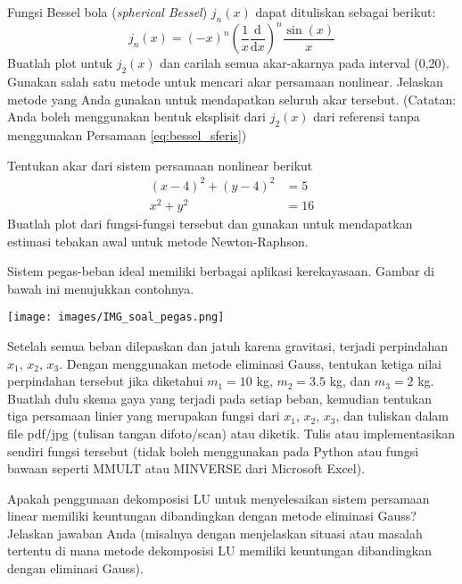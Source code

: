 \begin{soal}
Fungsi Bessel bola (\textit{spherical Bessel}) $j_{n}(x)$ dapat dituliskan sebagai
berikut:
\begin{equation}
j_{n}(x) = (-x)^{n}
\left( \frac{1}{x} \frac{\mathrm{d}}{\mathrm{d}x} \right)^n
\frac{\sin(x)}{x}
\label{eq:bessel_sferis}
\end{equation}
Buatlah plot untuk $j_{2}(x)$ dan carilah semua akar-akarnya pada interval (0,20).
Gunakan salah satu metode untuk mencari akar persamaan nonlinear. Jelaskan metode
yang Anda gunakan untuk mendapatkan seluruh akar tersebut.
(Catatan: Anda boleh menggunakan bentuk eksplisit dari $j_2(x)$ dari referensi
tanpa menggunakan Persamaan \ref{eq:bessel_sferis})
\end{soal}


\begin{soal}
Tentukan akar dari sistem persamaan nonlinear berikut
\begin{align*}
(x - 4)^2 + (y - 4)^2 & = 5 \\
x^2 + y^2 & = 16
\end{align*}
Buatlah plot dari fungsi-fungsi tersebut dan gunakan untuk mendapatkan estimasi tebakan
awal untuk metode Newton-Raphson.
\end{soal}




\begin{soal}
Sistem pegas-beban ideal memiliki berbagai aplikasi kerekayasaan.
Gambar di bawah ini menujukkan contohnya.

{\centering
\texttt{[image: images/IMG\_soal\_pegas.png]}
\par}

Setelah semua beban dilepaskan dan jatuh karena gravitasi,
terjadi perpindahan $x_1$, $x_2$, $x_3$. Dengan menggunakan metode eliminasi Gauss,
tentukan ketiga nilai perpindahan tersebut jika diketahui $m_1=10$ kg, $m_2=3.5$ kg,
dan $m_3=2$ kg.
Buatlah dulu skema gaya yang terjadi pada setiap beban, kemudian tentukan
tiga persamaan linier yang merupakan fungsi dari $x_1$, $x_2$, $x_3$,
dan tuliskan dalam file pdf/jpg (tulisan tangan difoto/scan) atau diketik.
Tulis atau implementasikan sendiri fungsi tersebut (tidak boleh menggunakan
 pada Python atau fungsi bawaan seperti MMULT atau MINVERSE
dari Microsoft Excel).
\end{soal}


\begin{soal}
Apakah penggunaan dekomposisi LU untuk menyelesaikan sistem persamaan linear memiliki keuntungan
dibandingkan dengan metode eliminasi Gauss? Jelaskan jawaban Anda (misalnya dengan menjelaskan
situasi atau masalah tertentu di mana metode dekomposisi LU memiliki keuntungan dibandingkan
dengan eliminasi Gauss).
\end{soal}


